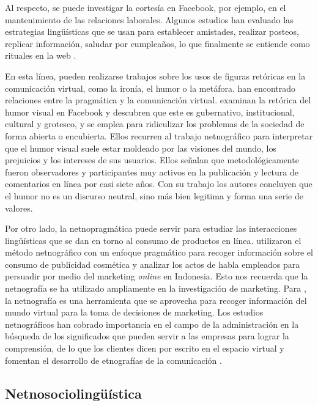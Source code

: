 Al respecto, se puede investigar la cortesía en Facebook, por ejemplo,
en el mantenimiento de las relaciones laborales. Algunos estudios han
evaluado las estrategias lingüísticas que se usan para establecer
amistades, realizar posteos, replicar información, saludar por
cumpleaños, lo que finalmente se entiende como rituales en la web \cite{west2013}.

En esta línea, pueden realizarse trabajos sobre los usos de figuras
retóricas en la comunicación virtual, como la ironía, el humor o la
metáfora. \textcite{taiwo2016analyzing} han encontrado relaciones entre la
pragmática y la comunicación virtual. \textcite{coker2016} examinan la
retórica del humor visual en Facebook y descubren que este es
gubernativo, institucional, cultural y grotesco, y se emplea para
ridiculizar los problemas de la sociedad de forma abierta o encubierta.
Ellos recurren al trabajo netnográfico para interpretar que el humor
visual suele estar moldeado por las visiones del mundo, los prejuicios y
los intereses de sus usuarios. Ellos señalan que metodológicamente
fueron observadores y participantes muy activos en la publicación y
lectura de comentarios en línea por casi siete años. Con su trabajo los
autores concluyen que el humor no es un discurso neutral, sino más bien
legitima y forma una serie de valores.

Por otro lado, la netnopragmática puede servir para estudiar las
interacciones lingüísticas que se dan en torno al consumo de productos
en línea. \textcite{septianasari2021} utilizaron el método
netnográfico con un enfoque pragmático para recoger información sobre el
consumo de publicidad cosmética y analizar los actos de habla empleados
para persuadir por medio del marketing \emph{online} en Indonesia. Esto
nos recuerda que la netnografía se ha utilizado ampliamente en la
investigación de marketing. Para \textcite{casas-romeo2014}, la
netnografía es una herramienta que se aprovecha para recoger información
del mundo virtual para la toma de decisiones de marketing. Los estudios
netnográficos han cobrado importancia en el campo de la administración
en la búsqueda de los significados que pueden servir a las empresas para
lograr la comprensión, de lo que los clientes dicen por escrito en el
espacio virtual y fomentan el desarrollo de etnografías de la
comunicación \cite{freitas2012netnografia}.

\subsection{Netnosociolingüística}\label{sub-sec-netnosociolingüística}

